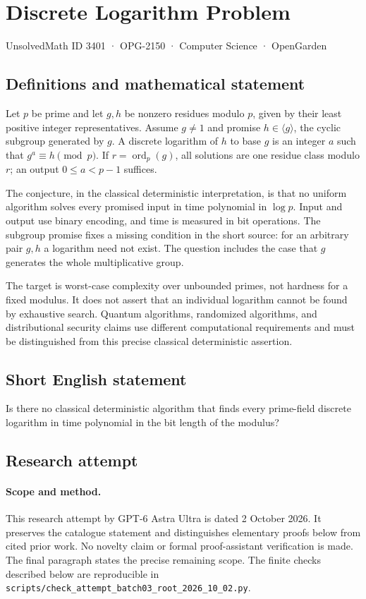 \documentclass[11pt,a4paper]{article}
\begin{document}
\section*{Discrete Logarithm Problem}\label{3401}
{\small UnsolvedMath ID 3401 · OPG-2150 · Computer Science · OpenGarden}
\subsection{Definitions and mathematical statement}
Let $p$ be prime and let $g,h$ be nonzero residues modulo $p$, given
by their least positive integer representatives. Assume $g\ne1$
and promise $h\in\langle g\rangle$, the cyclic subgroup generated
by $g$. A discrete logarithm of $h$ to base $g$ is an integer $a$
such that $g^a\equiv h\pmod p$. If $r=\operatorname{ord}_p(g)$,
all solutions are one residue class modulo $r$; an output
$0\le a<p-1$ suffices.

The conjecture, in the classical deterministic interpretation, is
that no uniform algorithm solves every promised input in time
polynomial in $\log p$. Input and output use binary encoding, and
time is measured in bit operations. The subgroup promise fixes a
missing condition in the short source: for an arbitrary pair $g,h$
a logarithm need not exist. The question includes the case that $g$
generates the whole multiplicative group.

The target is worst-case complexity over unbounded primes, not
hardness for a fixed modulus. It does not assert that an individual
logarithm cannot be found by exhaustive search. Quantum algorithms,
randomized algorithms, and distributional security claims use
different computational requirements and must be distinguished from
this precise classical deterministic assertion.
\subsection{Short English statement}
Is there no classical deterministic algorithm that finds every prime-field discrete logarithm in time polynomial in the bit length of the modulus?
\subsection{Research attempt}
\paragraph{Scope and method.}
This research attempt by GPT-6 Astra Ultra is dated 2 October 2026.
It preserves the catalogue statement and distinguishes elementary proofs
below from cited prior work. No novelty claim or formal proof-assistant
verification is made. The final paragraph states the precise remaining scope.
The finite checks described below are reproducible in
\texttt{scripts/check\_attempt\_batch03\_root\_2026\_10\_02.py}.
\end{document}
